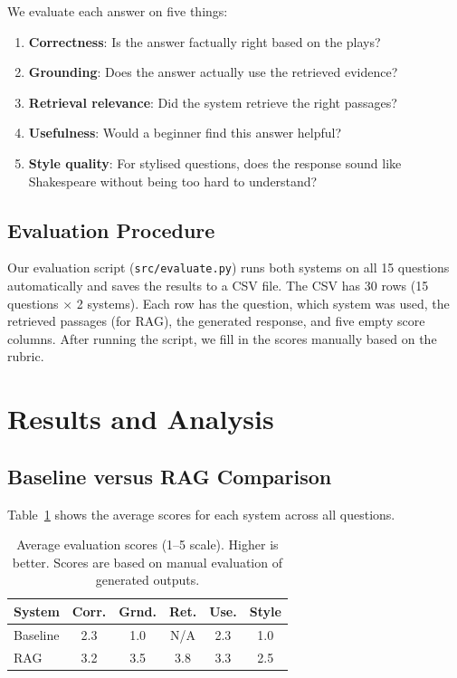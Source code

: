 \documentclass[10pt,conference]{IEEEtran}
\begin{document}
We evaluate each answer on five things:
\begin{enumerate}
    \item \textbf{Correctness}: Is the answer factually right based on the plays?
    \item \textbf{Grounding}: Does the answer actually use the retrieved evidence?
    \item \textbf{Retrieval relevance}: Did the system retrieve the right passages?
    \item \textbf{Usefulness}: Would a beginner find this answer helpful?
    \item \textbf{Style quality}: For stylised questions, does the response sound like Shakespeare without being too hard to understand?
\end{enumerate}

\subsection{Evaluation Procedure}

Our evaluation script (\texttt{src/evaluate.py}) runs both systems on all 15 questions automatically and saves the results to a CSV file. The CSV has 30 rows (15 questions $\times$ 2 systems). Each row has the question, which system was used, the retrieved passages (for RAG), the generated response, and five empty score columns. After running the script, we fill in the scores manually based on the rubric.

\section{Results and Analysis}
\label{sec:results}

\subsection{Baseline versus RAG Comparison}

Table~\ref{tab:results-summary} shows the average scores for each system across all questions.

\begin{table}[h]
\centering
\caption{Average evaluation scores (1--5 scale). Higher is better. Scores are based on manual evaluation of generated outputs.}
\label{tab:results-summary}
\begin{tabular}{lccccc}
\toprule
System & Corr. & Grnd. & Ret. & Use. & Style \\
\midrule
Baseline & 2.3 & 1.0 & N/A & 2.3 & 1.0 \\
RAG & 3.2 & 3.5 & 3.8 & 3.3 & 2.5 \\
\bottomrule
\end{tabular}
\end{table}
\end{document}
